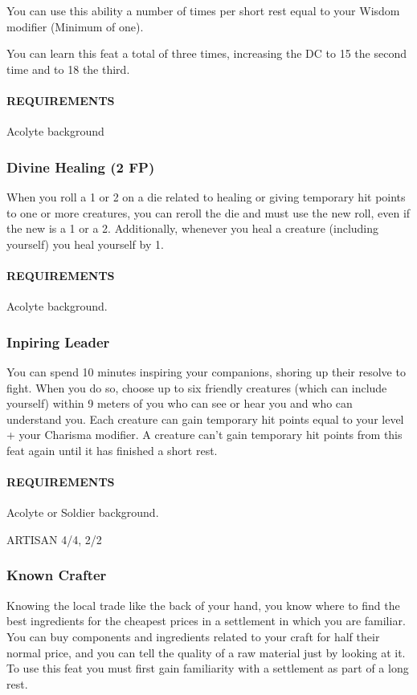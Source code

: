         You can use this ability a number of times per short rest equal to your Wisdom modifier (Minimum of one).

        You can learn this feat a total of three times, increasing the DC to 15 the second time and to 18 the third.
        \paragraph{REQUIREMENTS} Acolyte background

    \subsubsection{Divine Healing (2 FP)} \label{feat::divinehealing}
        When you roll a 1 or 2 on a die related to healing or giving temporary hit points to one or more creatures, you can reroll the die and must use the new roll, even if the new is a 1 or a 2.
        Additionally, whenever you heal a creature (including yourself) you heal yourself by 1.
        \paragraph{REQUIREMENTS} Acolyte background.

    \subsubsection{Inpiring Leader} \label{feat::inspiringleader}
        You can spend 10 minutes inspiring your companions, shoring up their resolve to fight.
        When you do so, choose up to six friendly creatures (which can include yourself) within 9 meters of you who can see or hear you and who can understand you.
        Each creature can gain temporary hit points equal to your level + your Charisma modifier.
        A creature can't gain temporary hit points from this feat again until it has finished a short rest.
        \paragraph{REQUIREMENTS} Acolyte or Soldier background.

ARTISAN 4/4, 2/2
    \subsubsection{Known Crafter} \label{feat::knowncrafter}
        Knowing the local trade like the back of your hand, you know where to find the best ingredients for the cheapest prices in a settlement in which you are familiar.
        You can buy components and ingredients related to your craft for half their normal price, and you can tell the quality of a raw material just by looking at it.
        To use this feat you must first gain familiarity with a settlement as part of a long rest.
